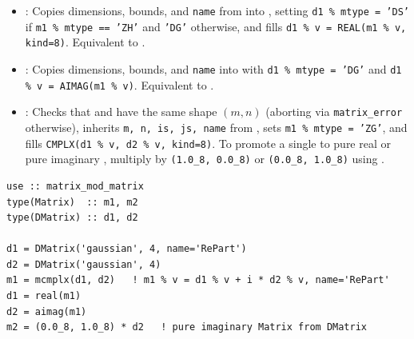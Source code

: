 \begin{itemize}
  \item {}: Copies dimensions, bounds, and \texttt{name} from  into  , setting \texttt{d1 \% mtype = 'DS'} if \texttt{m1 \% mtype == 'ZH'} and \texttt{'DG'} otherwise, and fills \texttt{d1 \% v = REAL(m1 \% v, kind=8)}. Equivalent to .
  \item {}: Copies dimensions, bounds, and \texttt{name} into   with \texttt{d1 \% mtype = 'DG'} and \texttt{d1 \% v = AIMAG(m1 \% v)}. Equivalent to .
  \item {}: Checks that  and  have the same shape $(m, n)$ (aborting via \texttt{matrix\_error} otherwise), inherits \texttt{m, n, is, js, name} from , sets \texttt{m1 \% mtype = 'ZG'}, and fills \texttt{CMPLX(d1 \% v, d2 \% v, kind=8)}. To promote a single  to pure real or pure imaginary , multiply by \texttt{(1.0\_8, 0.0\_8)} or \texttt{(0.0\_8, 1.0\_8)} using \procname{*}.
\end{itemize}

\begin{description}[leftmargin=2.2cm, style=nextline]
\end{description}

\lstset{language=[95]Fortran}
\begin{lstlisting}
use :: matrix_mod_matrix
type(Matrix)  :: m1, m2
type(DMatrix) :: d1, d2

d1 = DMatrix('gaussian', 4, name='RePart')
d2 = DMatrix('gaussian', 4)
m1 = mcmplx(d1, d2)   ! m1 % v = d1 % v + i * d2 % v, name='RePart'
d1 = real(m1)
d2 = aimag(m1)
m2 = (0.0_8, 1.0_8) * d2   ! pure imaginary Matrix from DMatrix
\end{lstlisting}



